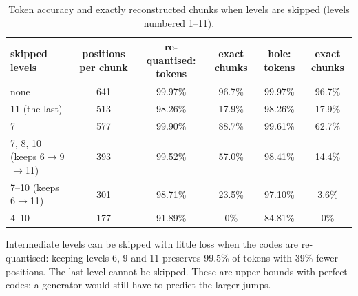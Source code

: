 \begin{table}[h]
\centering
\small
\caption{Token accuracy and exactly reconstructed chunks when levels are skipped (levels numbered 1--11).}
\begin{tabular}{@{}lccccc@{}}
\toprule
skipped levels & positions per chunk & re-quantised: tokens & exact chunks & hole: tokens & exact chunks \\
\midrule
none & 641 & 99.97\% & 96.7\% & 99.97\% & 96.7\% \\
11 (the last) & 513 & 98.26\% & 17.9\% & 98.26\% & 17.9\% \\
7 & 577 & 99.90\% & 88.7\% & 99.61\% & 62.7\% \\
7, 8, 10 (keeps 6$\to$9$\to$11) & 393 & 99.52\% & 57.0\% & 98.41\% & 14.4\% \\
7--10 (keeps 6$\to$11) & 301 & 98.71\% & 23.5\% & 97.10\% & 3.6\% \\
4--10 & 177 & 91.89\% & 0\% & 84.81\% & 0\% \\
\bottomrule
\end{tabular}
\end{table}

Intermediate levels can be skipped with little loss when the codes are re-quantised: keeping levels 6, 9 and 11
preserves 99.5\% of tokens with 39\% fewer positions. The last level cannot be skipped. These are upper bounds with
perfect codes; a generator would still have to predict the larger jumps.
